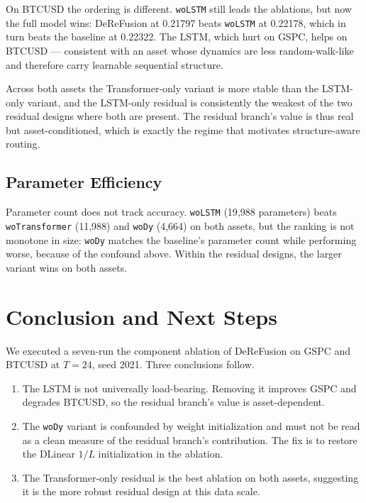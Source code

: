 \documentclass[conference]{IEEEtran}
\begin{document}
On BTCUSD the ordering is different. \texttt{woLSTM} still leads the
ablations, but now the full model wins: DeReFusion at 0.21797 beats
\texttt{woLSTM} at 0.22178, which in turn beats the baseline at 0.22322.
The LSTM, which hurt on GSPC, helps on BTCUSD --- consistent with an asset
whose dynamics are less random-walk-like and therefore carry learnable
sequential structure.

Across both assets the Transformer-only variant is more stable than the
LSTM-only variant, and the LSTM-only residual is consistently the weakest
of the two residual designs where both are present. The residual branch's
value is thus real but asset-conditioned, which is exactly the regime that
motivates structure-aware routing.

\subsection{Parameter Efficiency}

Parameter count does not track accuracy. \texttt{woLSTM} (19{,}988
parameters) beats \texttt{woTransformer} (11{,}988) and \texttt{woDy}
(4{,}664) on both assets, but the ranking is not monotone in size:
\texttt{woDy} matches the baseline's parameter count while performing
worse, because of the confound above. Within the residual designs, the
larger variant wins on both assets.

\section{Conclusion and Next Steps}
\label{sec:conclusion}

We executed a seven-run the component ablation of DeReFusion on GSPC and
BTCUSD at $T{=}24$, seed 2021. Three conclusions follow.

\begin{enumerate}
  \item The LSTM is not universally load-bearing. Removing it improves
        GSPC and degrades BTCUSD, so the residual branch's value is
        asset-dependent.
  \item The \texttt{woDy} variant is confounded by weight initialization
        and must not be read as a clean measure of the residual branch's
        contribution. The fix is to restore the DLinear
        $1/L$ initialization in the ablation.
  \item The Transformer-only residual is the best ablation on both assets,
        suggesting it is the more robust residual design at this data
        scale.
\end{enumerate}
\end{document}

